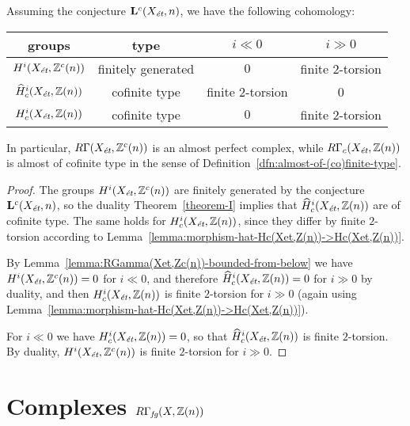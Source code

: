 \documentclass{article}
\numberwithin{equation}{section}
\begin{document}
\begin{lemma}
  \label{lemma:RGammac(Xet,Z(n))-almost-cofinite-type}
  Assuming the conjecture $\mathbf{L}^c (X_\et,n)$, we have the following
  cohomology:
  \begin{center}
    \renewcommand{\arraystretch}{1.5}
    \begin{tabular}{cccc}
      \hline
      \textbf{groups} & \textbf{type} & $i \ll 0$ & $i \gg 0$ \\
      \hline
      $H^i (X_\et, \ZZ^c (n))$ & finitely generated & $0$ & finite $2$-torsion \\
      $\widehat{H}^i_c (X_\et, \ZZ (n))$ & cofinite type & finite $2$-torsion & 0 \\
      $H^i_c (X_\et, \ZZ (n))$ & cofinite type & $0$ & finite $2$-torsion \\
      \hline
    \end{tabular}
  \end{center}
  In particular, $R\Gamma (X_\et, \ZZ^c (n))$ is an almost perfect complex,
  while $R\Gamma_c (X_\et, \ZZ (n))$ is almost of cofinite type in the sense of
  Definition~\ref{dfn:almost-of-(co)finite-type}.

  \begin{proof}
    The groups $H^i (X_\et, \ZZ^c (n))$ are finitely generated by the conjecture
    $\mathbf{L}^c (X_\et,n)$, so the duality Theorem~\ref{theorem-I} implies that
    $\widehat{H}^i_c (X_\et, \ZZ (n))$ are of cofinite type. The same holds for
    $H^i_c (X_\et, \ZZ(n))$, since they differ by finite $2$-torsion according to
    Lemma~\ref{lemma:morphism-hat-Hc(Xet,Z(n))->Hc(Xet,Z(n))}.

    By Lemma~\ref{lemma:RGamma(Xet,Zc(n))-bounded-from-below} we have
    $H^i (X_\et, \ZZ^c (n)) = 0$ for $i \ll 0$, and therefore
    $\widehat{H}^i_c (X_\et, \ZZ (n)) = 0$ for $i \gg 0$ by duality,
    and then $H^i_c (X_\et, \ZZ (n))$ is finite $2$-torsion for $i \gg 0$
    (again using Lemma~\ref{lemma:morphism-hat-Hc(Xet,Z(n))->Hc(Xet,Z(n))}).

    For $i \ll 0$ we have $H^i_c (X_\et, \ZZ (n)) = 0$, so that
    $\widehat{H}^i_c (X_\et, \ZZ (n))$ is finite $2$-torsion. By duality,
    $H^i (X_\et, \ZZ^c (n))$ is finite $2$-torsion for $i \gg 0$.
  \end{proof}
\end{lemma}


\section{Complexes \texorpdfstring{$R\Gamma_\fg (X, \ZZ(n))$}{RΓ\_fg (X, ℤ(n))}}
\label{sec:RGamma-fg}
\end{document}
